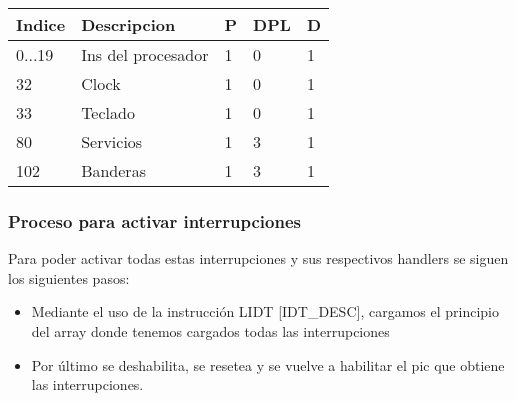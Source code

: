 \begin{tabular}{l l l l l}
Indice & Descripcion & P & DPL & D\\

\hline
0...19 & Ins del procesador & 1 & 0 & 1 \\
32 & Clock & 1 & 0 & 1\\
33 & Teclado	 & 1 & 0 & 1\\
80 & Servicios & 1 & 3 & 1\\
102 & Banderas & 1 & 3 & 1\\
\end{tabular}

\subsubsection{Proceso para activar interrupciones}

Para poder activar todas estas interrupciones y sus respectivos handlers se siguen los siguientes pasos:\\
\begin{itemize}
 \item Mediante el uso de la instrucci\'on LIDT [IDT\_DESC], cargamos el principio del array donde tenemos cargados todas las interrupciones
 \item Por \'ultimo se deshabilita, se resetea y se vuelve a habilitar el pic que obtiene las interrupciones.
\end{itemize}
